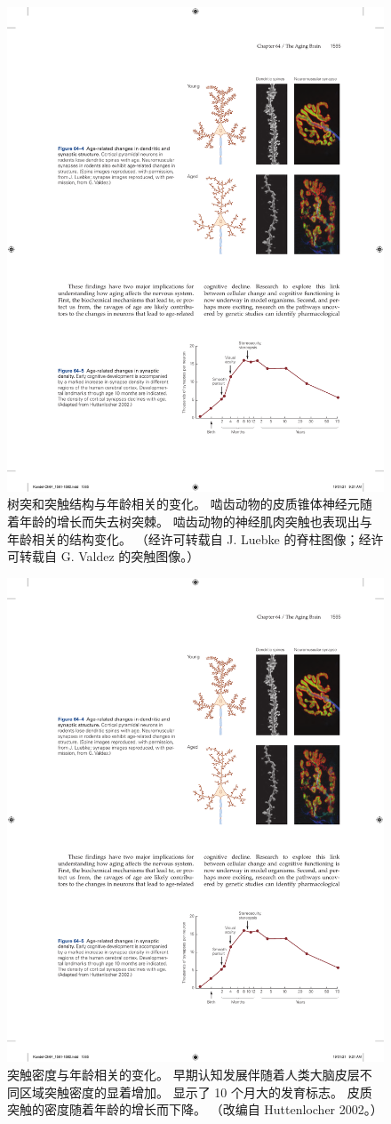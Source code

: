 \begin{figure}[htbp]
	\centering
	\includegraphics[width=0.6\linewidth]{chap64/fig_64_4}
	\caption{树突和突触结构与年龄相关的变化。 啮齿动物的皮质锥体神经元随着年龄的增长而失去树突棘。 啮齿动物的神经肌肉突触也表现出与年龄相关的结构变化。 （经许可转载自 J. Luebke 的脊柱图像；经许可转载自 G. Valdez 的突触图像。）}
	\label{fig:64_4}
\end{figure}

\begin{figure}[htbp]
	\centering
	\includegraphics[width=0.6\linewidth]{chap64/fig_64_5}
	\caption{突触密度与年龄相关的变化。 早期认知发展伴随着人类大脑皮层不同区域突触密度的显着增加。 显示了 10 个月大的发育标志。 皮质突触的密度随着年龄的增长而下降。 （改编自 Huttenlocher 2002。）}
	\label{fig:64_5}
\end{figure}

